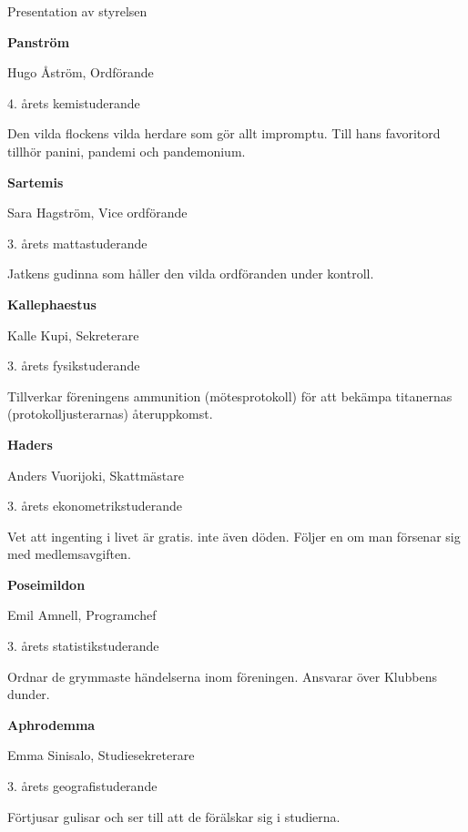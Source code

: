 \documentclass{spektraklet}
\begin{document}
\begin{artikel}{Presentation av styrelsen}{}
\begin{twocolumns}


\textbf{Panström}

Hugo Åström, Ordförande

4. årets kemistuderande

Den vilda flockens vilda herdare som gör allt impromptu. Till hans favoritord tillhör panini, pandemi och pandemonium.


\textbf{Sartemis}

Sara Hagström, Vice ordförande

3. årets mattastuderande

Jatkens gudinna som håller den vilda ordföranden under kontroll.


\textbf{Kallephaestus}

Kalle Kupi, Sekreterare

3. årets fysikstuderande

Tillverkar föreningens ammunition (mötesprotokoll) för att bekämpa titanernas (protokolljusterarnas) återuppkomst.


\textbf{Haders}

Anders Vuorijoki, Skattmästare

3. årets ekonometrikstuderande

Vet att ingenting i livet är gratis. inte även döden. Följer en om man försenar sig med medlemsavgiften.


\textbf{Poseimildon}

Emil Amnell, Programchef

3. årets statistikstuderande

Ordnar de grymmaste händelserna inom föreningen. Ansvarar över Klubbens dunder.


\textbf{Aphrodemma}

Emma Sinisalo, Studiesekreterare

3. årets geografistuderande

Förtjusar gulisar och ser till att de förälskar sig i studierna.


\end{twocolumns}
\end{artikel}
\end{document}
